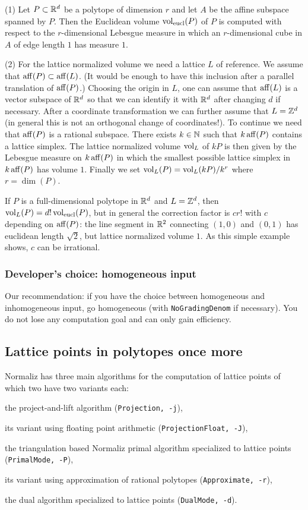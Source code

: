 (1) Let $P\subset{\mathbb R}^d$ be a polytope of dimension $r$ and let $A$ be the affine subspace spanned by $P$. Then the Euclidean volume $\operatorname{vol}_{\textup{eucl}}(P)$ of $P$ is computed with respect to the $r$-dimensional Lebesgue measure in which an $r$-dimensional cube in $A$ of edge length $1$ has measure $1$.

(2) For the lattice normalized volume we need a lattice $L$ of reference. We assume that $\operatorname{aff}(P)\subset\operatorname{aff}(L)$. (It would be enough to have this inclusion after a parallel translation of $\operatorname{aff}(P)$.) Choosing the origin in $L$, one can assume that $\operatorname{aff}(L)$ is a vector subspace of ${\mathbb R}^d$ so that we can identify it with ${\mathbb R}^d$ after changing $d$ if necessary. After a coordinate transformation we can further assume that $L={\mathbb Z}^d$ (in general this is not an orthogonal change of coordinates!). To continue we need that $\operatorname{aff}(P)$ is a rational subspace. There exists $k\in{\mathbb N}$ such that $k\operatorname{aff}(P)$ contains a lattice simplex. The lattice normalized volume $\operatorname{vol}_L$ of $kP$ is then given by the Lebesgue measure on $k\operatorname{aff}(P)$ in which the smallest possible lattice simplex in $k\operatorname{aff}(P)$ has volume $1$. Finally we set $\operatorname{vol}_L(P)=\operatorname{vol}_L(kP)/k^r$ where $r=\dim(P)$.

If $P$ is a full-dimensional polytope in ${\mathbb R}^d$ and $L={\mathbb Z}^d$, then $\operatorname{vol}_L(P)=d!\operatorname{vol}_{\textup{eucl}}(P)$, but in general the correction factor is $cr!$ with $c$ depending on $\operatorname{aff}(P)$: the line segment in ${\mathbb R}^2$ connecting $(1,0)$ and $(0,1)$ has euclidean length $\sqrt{2}$, but lattice normalized volume $1$. As this simple example shows, $c$ can be irrational.

\subsubsection{Developer's choice: homogeneous input}

Our recommendation: if you have the choice between homogeneous and inhomogeneous input, go homogeneous (with \verb|NoGradingDenom| if necessary). You do not lose any computation goal and can only gain efficiency.

\subsection{Lattice points in polytopes once more}\label{LattPoints}

Normaliz has three main algorithms for the computation of lattice points of which two have two variants each:
\begin{arab}
	\item the project-and-lift algorithm (\verb|Projection, -j|),
	\item its variant using floating point arithmetic (\verb|ProjectionFloat, -J|),
	\item the triangulation based Normaliz primal algorithm specialized to lattice points\\ (\verb|PrimalMode, -P|),
	\item its variant using approximation of rational polytopes (\verb|Approximate, -r|),
	\item the dual algorithm specialized to lattice points (\verb|DualMode, -d|).
\end{arab}

